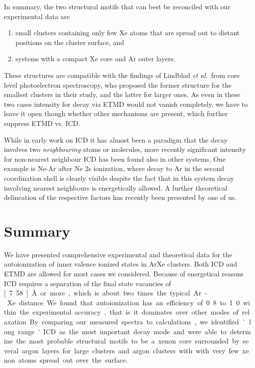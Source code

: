 \documentclass[journal=jpccck,manuscript=article]{achemso}
\begin{document}
In summary, the two structural motifs that can best be reconciled with our experimental data are
\begin{enumerate}
	\item small clusters containing only few Xe atoms that are spread out to distant positions on the cluster surface, and
	\item systems with a compact Xe core and Ar outer layers.
\end{enumerate}
These structures are compatible with the findings of Lindblad {\it et al.}\ from core level photoelectron spectroscopy, who proposed the former structure for the smallest clusters in their study, and the latter for larger ones.\cite{lindblad}
As even in these two cases intensity for decay via ETMD would not vanish completely, we have to leave it open though whether other mechanisms are present, which further suppress ETMD vs. ICD.

While in early work on ICD it has almost been a paradigm that the decay involves two {\it neighbouring} atoms or molecules,\cite{hergenhahn_review} more recently significant intensity for non-nearest neighbour ICD has been found also in other systems.
One example is Ne-Ar after Ne 2s ionization, where decay to Ar in the second coordination shell is clearly visible despite the fact that in this system decay involving nearest neighbours is energetically allowed.\cite{fasshauer2014}
A further theoretical delineation of the respective factors has recently been presented by one of us.\cite{fasshauernjp}


\section{Summary}
%
We have presented comprehensive experimental and theoretical data for the
autoionization of inner valence ionized states in ArXe clusters.
Both ICD and ETMD are allowed for most cases we considered.
Because of energetical reasons ICD requires a separation of the final state
vacancies of \unit[7.58]{\AA} or more, which is about two times the typical
Ar-Xe distance.
We found that autoionization has an efficiency of 0.8 to 1.0 within the
experimental accuracy, that is it dominates over other modes of relaxation.
By comparing our measured spectra to calculations, we identified `long range'
ICD as the most important decay mode and were able to determine the most
probable structural motifs to be a xenon core surrounded by several argon layers
for large clusters and argon clusters with with very few xenon atoms spread out
over the surface.
\end{document}

